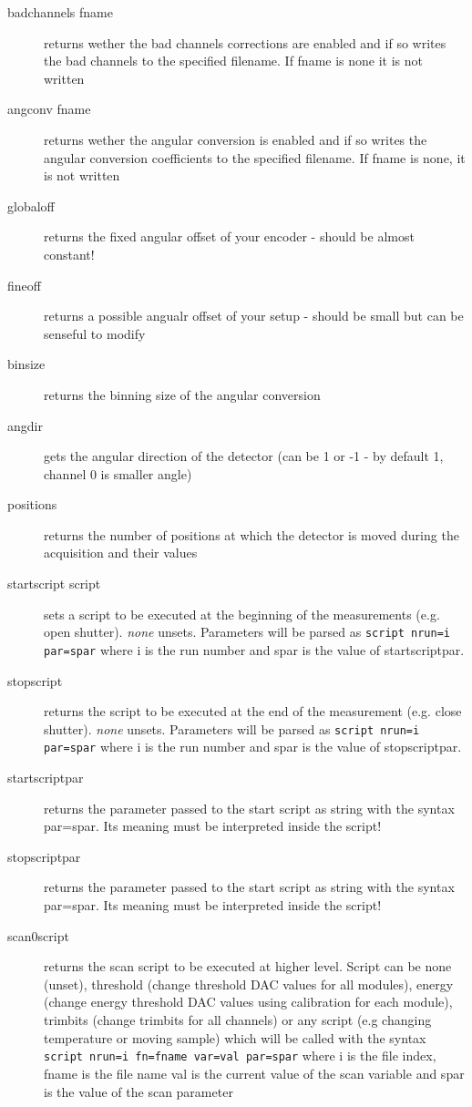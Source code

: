 \documentclass{report}
\begin{document}
\begin{description}
\item[badchannels fname] 	returns wether the bad channels corrections are enabled and if so writes the bad channels to the specified filename. If fname is none it is not written
\item[angconv fname]  	returns wether the angular conversion is enabled and if so writes the angular conversion coefficients to the specified filename. If fname is none, it is not written
\item[globaloff]  	returns the fixed angular offset of your encoder - should be almost constant!
\item[fineoff]  returns a possible angualr offset of your setup - should be small but can be senseful to modify
\item[binsize]  	returns the binning size of the angular conversion  
\item[angdir] 	gets the angular direction of the detector (can be 1 or -1 - by default 1, channel 0 is smaller angle)  
\item[positions]  	returns the number of positions at which the detector is moved during the acquisition and their values
\item[startscript script] sets a script to be executed at the beginning of the measurements (e.g. open shutter). \textit{none} unsets. Parameters will be parsed as \verb|script nrun=i par=spar| where i is the run number and spar is the value of startscriptpar.
\item[stopscript] returns the script to be executed at the end of the measurement (e.g. close shutter). \textit{none} unsets. Parameters will be parsed as \verb|script nrun=i par=spar| where i is the run number and spar is the value of stopscriptpar.
\item[startscriptpar] returns the parameter passed to the start script as string with the syntax par=spar. Its meaning must be interpreted inside the script!
\item[stopscriptpar]returns the parameter passed to the start script as string with the syntax par=spar. Its meaning must be interpreted inside the script!
\item[scan0script] returns the scan script to be executed at higher level. Script can be none (unset), threshold (change threshold DAC values for all modules), energy (change energy threshold DAC values using calibration for each module), trimbits (change trimbits for all channels) or any script (e.g changing temperature or moving sample) which will be called with the syntax \verb| script nrun=i fn=fname var=val par=spar| where i is the file index, fname is the file name val is the current value of the scan variable and spar is the value of the scan parameter

\end{description}
\end{document}
